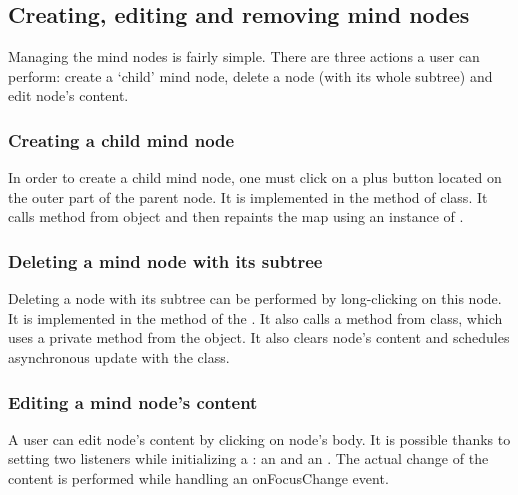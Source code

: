 \subsection{Creating, editing and removing mind nodes}
\label{subsec:drawing}
Managing the mind nodes is fairly simple. There are three actions a user can perform: create a `child' mind node, delete a node (with its whole subtree) and edit node's content. 

\subsubsection{Creating a child mind node}
\label{subsubsec:create-child}
In order to create a child mind node, one must click on a plus button located on the outer part of the parent node. It is implemented in the  method of  class. It calls  method from  object and then repaints the map using an instance of .

\subsubsection{Deleting a mind node with its subtree}
\label{subsubsec:delete-node}

Deleting a node with its subtree can be performed by long-clicking on this node. It is implemented in the  method of the . It also calls a  method from  class, which uses  a private method from the  object. It also clears node's content and schedules asynchronous update with the  class.
 
\subsubsection{Editing a mind node's content}
\label{subsubsec:delete-node}
A user can edit node's content by clicking on node's body. It is possible thanks to setting two listeners while initializing a : an  and an . The actual change of the content is performed while handling an onFocusChange event.

